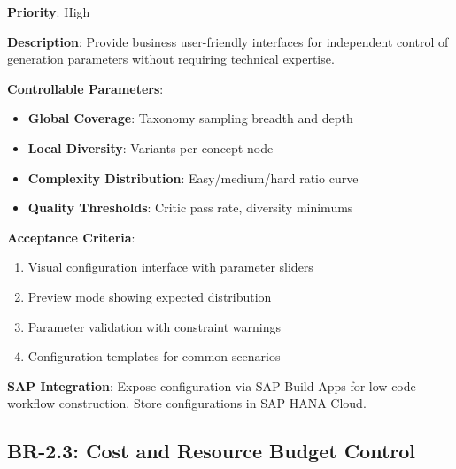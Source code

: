 \documentclass[12pt,a4paper,twoside]{report}
\begin{document}
\begin{tcolorbox}[colback=green!5,colframe=green!70,title=BR-2.2: Parameter Configuration Interface]
\textbf{Priority}: High

\textbf{Description}: Provide business user-friendly interfaces for independent
control of generation parameters without requiring technical expertise.

\textbf{Controllable Parameters}:
\begin{itemize}
\item \textbf{Global Coverage}: Taxonomy sampling breadth and depth
\item \textbf{Local Diversity}: Variants per concept node
\item \textbf{Complexity Distribution}: Easy/medium/hard ratio curve
\item \textbf{Quality Thresholds}: Critic pass rate, diversity minimums
\end{itemize}

\textbf{Acceptance Criteria}:
\begin{enumerate}
\item Visual configuration interface with parameter sliders
\item Preview mode showing expected distribution
\item Parameter validation with constraint warnings
\item Configuration templates for common scenarios
\end{enumerate}

\textbf{SAP Integration}: Expose configuration via SAP Build Apps for low-code
workflow construction. Store configurations in SAP HANA Cloud.
\end{tcolorbox}

\subsection{BR-2.3: Cost and Resource Budget Control}
\end{document}
